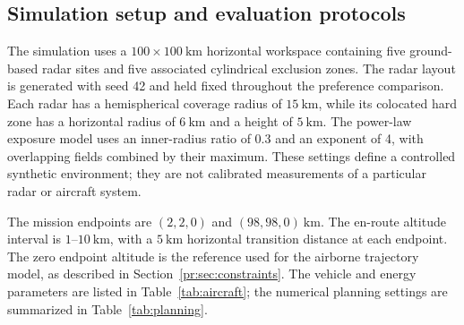 \documentclass[preprint,12pt]{elsarticle}
\begin{document}

\subsection{Simulation setup and evaluation protocols}
\label{sec:setup}

The simulation uses a $100\times100~\mathrm{km}$ horizontal workspace
containing five ground-based radar sites and five associated cylindrical
exclusion zones. The radar layout is generated with seed 42 and held fixed
throughout the preference comparison. Each radar has a hemispherical
coverage radius of $15~\mathrm{km}$, while its colocated hard zone has a
horizontal radius of $6~\mathrm{km}$ and a height of $5~\mathrm{km}$.
The power-law exposure model uses an inner-radius ratio of 0.3 and an
exponent of 4, with overlapping fields combined by their maximum.
These settings define a controlled synthetic environment; they are not
calibrated measurements of a particular radar or aircraft system.

The mission endpoints are $(2,2,0)$ and $(98,98,0)~\mathrm{km}$.
The en-route altitude interval is $1$--$10~\mathrm{km}$, with a
$5~\mathrm{km}$ horizontal transition distance at each endpoint.
The zero endpoint altitude is the reference used for the airborne
trajectory model, as described in Section~\ref{pr:sec:constraints}.
The vehicle and energy parameters are listed in Table~\ref{tab:aircraft};
the numerical planning settings are summarized in
Table~\ref{tab:planning}.
\end{document}
